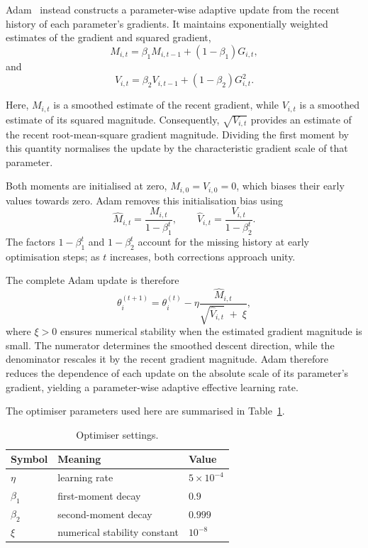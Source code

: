 \documentclass[10pt,a4paper]{article}
\begin{document}
Adam~\cite{adam} instead constructs a parameter-wise adaptive update from the
recent history of each parameter's gradients. It maintains exponentially
weighted estimates of the gradient and squared gradient,
\begin{equation}
M_{i,t}
=
\beta_1 M_{i,t-1}
+
(1-\beta_1)G_{i,t},
\end{equation}
and
\begin{equation}
V_{i,t}
=
\beta_2 V_{i,t-1}
+
(1-\beta_2)G_{i,t}^2.
\end{equation}

Here, $M_{i,t}$ is a smoothed estimate of the recent gradient, while $V_{i,t}$
is a smoothed estimate of its squared magnitude. Consequently,
$\sqrt{V_{i,t}}$ provides an estimate of the recent root-mean-square gradient
magnitude. Dividing the first moment by this quantity normalises the update by
the characteristic gradient scale of that parameter.

Both moments are initialised at zero, $M_{i,0}=V_{i,0}=0$, which biases their
early values towards zero. Adam removes this initialisation bias using
\begin{equation}
\hat M_{i,t}
=
\frac{M_{i,t}}{1-\beta_1^t},
\qquad
\hat V_{i,t}
=
\frac{V_{i,t}}{1-\beta_2^t}.
\end{equation}
The factors $1-\beta_1^t$ and $1-\beta_2^t$ account for the missing history at
early optimisation steps; as $t$ increases, both corrections approach unity.

The complete Adam update is therefore
\begin{equation}
\theta_i^{(t+1)}
=
\theta_i^{(t)}
-
\eta
\frac{\hat M_{i,t}}
{\sqrt{\hat V_{i,t}} \;+\; \xi},
\end{equation}
where $\xi>0$ ensures numerical stability when the estimated gradient magnitude
is small. The numerator determines the smoothed descent direction, while the
denominator rescales it by the recent gradient magnitude. Adam therefore reduces
the dependence of each update on the absolute scale of its parameter's gradient,
yielding a parameter-wise adaptive effective learning rate.

The optimiser parameters used here are summarised in
Table~\ref{tab:optimiser-settings}.

\begin{table}[H]
\centering\small
\begin{tabular}{lll}
\toprule
Symbol & Meaning & Value \\
\midrule
$\eta$ & learning rate & $5\times10^{-4}$ \\
$\beta_1$ & first-moment decay & $0.9$ \\
$\beta_2$ & second-moment decay & $0.999$ \\
$\xi$ & numerical stability constant & $10^{-8}$ \\
\bottomrule
\end{tabular}
\caption{Optimiser settings.}
\label{tab:optimiser-settings}
\end{table}
\end{document}
